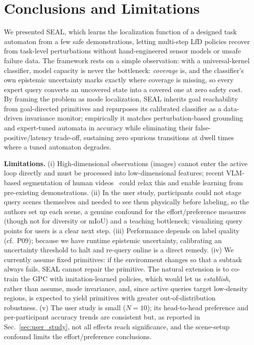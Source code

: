 \section{Conclusions and Limitations}
\label{sec:limitations}
We presented SEAL, which learns the localization function of a designed task automaton from a few safe demonstrations, letting multi-step LfD policies recover from task-level perturbations without hand-engineered sensor models or unsafe failure data. The framework rests on a simple observation: with a universal-kernel classifier, model capacity is never the bottleneck: \emph{coverage} is, and the classifier's own epistemic uncertainty marks exactly where coverage is missing, so every expert query converts an uncovered state into a covered one at zero safety cost. By framing the problem as mode localization, SEAL inherits goal reachability from goal-directed primitives and repurposes its calibrated classifier as a data-driven invariance monitor; empirically it matches perturbation-based grounding and expert-tuned automata in accuracy while eliminating their false-positive/latency trade-off, sustaining zero spurious transitions at dwell times where a tuned automaton degrades.

\textbf{Limitations.} (i) High-dimensional observations (images) cannot enter the active loop directly and must be processed into low-dimensional features; recent VLM-based segmentation of human videos~\cite{wang2024vlmseerobotdo} could relax this and enable learning from pre-existing demonstrations. (ii) In the user study, participants could not stage query scenes themselves and needed to see them physically before labeling, so the authors set up each scene, a genuine confound for the effort/preference measures (though not for diversity or mIoU) and a teaching bottleneck; visualizing query points for users is a clear next step. (iii) Performance depends on label quality (cf.\ P09); because we have runtime epistemic uncertainty, calibrating an uncertainty threshold to halt and re-query online is a direct remedy. (iv) We currently assume fixed primitives: if the environment changes so that a subtask always fails, SEAL cannot repair the primitive. The natural extension is to co-train the GPC with imitation-learned policies, which would let us \emph{establish}, rather than assume, mode invariance, and, since active queries target low-density regions, is expected to yield primitives with greater out-of-distribution robustness. (v) The user study is small ($N{=}10$); its head-to-head preference and per-participant accuracy trends are consistent but, as reported in Sec.~\ref{sec:user_study}, not all effects reach significance, and the scene-setup confound limits the effort/preference conclusions.
